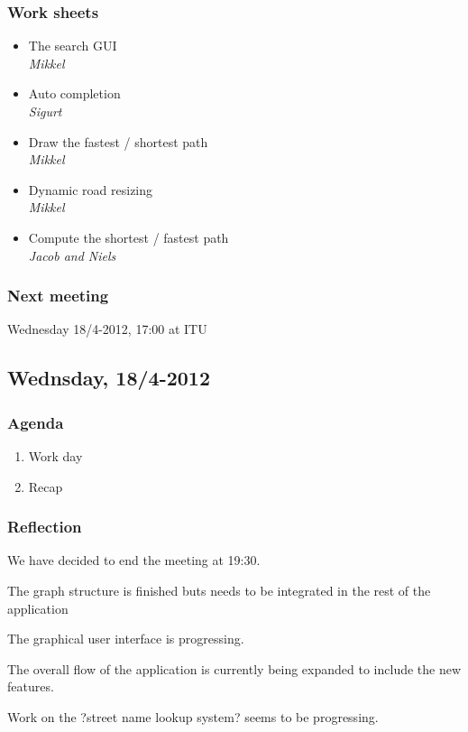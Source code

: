 \documentclass[a4paper,11pt]{article}
\begin{document}
\subsubsection*{Work sheets}
\begin{itemize}
	\item The search GUI \\
		\textsl{Mikkel}
	\item Auto completion \\
		\textsl{Sigurt}
	\item Draw the fastest / shortest path \\
		\textsl{Mikkel}
	\item Dynamic road resizing \\
		\textsl{Mikkel}
	\item Compute the shortest / fastest path \\
		\textsl{Jacob and Niels}
\end{itemize}

\subsubsection*{Next meeting}
Wednesday 18/4-2012, 17:00 at ITU


\pagebreak
\subsection{Wednsday, 18/4-2012}

\subsubsection*{Agenda}
\begin{enumerate}
	\item Work day
	\item Recap
\end{enumerate}

\subsubsection*{Reflection}
We have decided to end the meeting at 19:30.

The graph structure is finished buts needs to be integrated in the rest of the application

The graphical user interface is progressing.

The overall flow of the application is currently being expanded to include the new features.

Work on the  ?street name lookup system? seems to be progressing.
\end{document}
